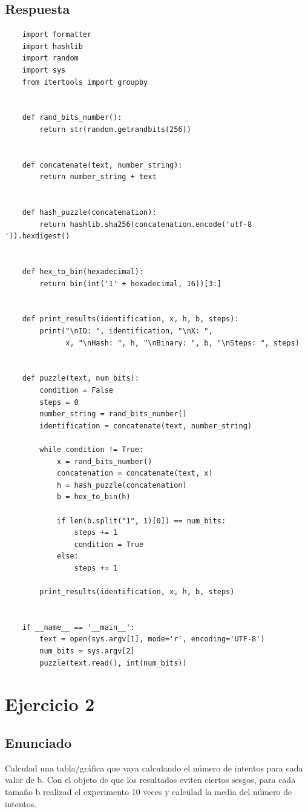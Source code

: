 \documentclass[10pt,a4paper,spanish]{report}
\begin{document}
\section{Respuesta}
\noindent

\begin{verbatim}
	import formatter
	import hashlib
	import random
	import sys
	from itertools import groupby


	def rand_bits_number():
	    return str(random.getrandbits(256))


	def concatenate(text, number_string):
	    return number_string + text


	def hash_puzzle(concatenation):
	    return hashlib.sha256(concatenation.encode('utf-8 ')).hexdigest()


	def hex_to_bin(hexadecimal):
	    return bin(int('1' + hexadecimal, 16))[3:]


	def print_results(identification, x, h, b, steps):
	    print("\nID: ", identification, "\nX: ",
	          x, "\nHash: ", h, "\nBinary: ", b, "\nSteps: ", steps)


	def puzzle(text, num_bits):
	    condition = False
	    steps = 0
	    number_string = rand_bits_number()
	    identification = concatenate(text, number_string)

	    while condition != True:
	        x = rand_bits_number()
	        concatenation = concatenate(text, x)
	        h = hash_puzzle(concatenation)
	        b = hex_to_bin(h)

	        if len(b.split("1", 1)[0]) == num_bits:
	            steps += 1
	            condition = True
	        else:
	            steps += 1

	    print_results(identification, x, h, b, steps)


	if __name__ == '__main__':
	    text = open(sys.argv[1], mode='r', encoding='UTF-8')
	    num_bits = sys.argv[2]
	    puzzle(text.read(), int(num_bits))

\end{verbatim}

\chapter{Ejercicio 2}

\section{Enunciado}
\noindent
Calculad una tabla/gráfica que vaya calculando el número de intentos para cada valor de b. Con el objeto de que los resultados eviten ciertos sesgos, para cada tamaño b realizad el experimento 10 veces y calculad la media del número de intentos.
\end{document}
